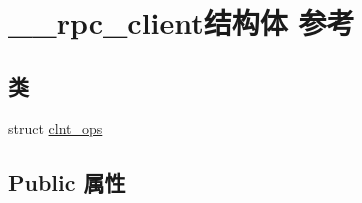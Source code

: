 \hypertarget{struct____rpc__client}{}\section{\+\_\+\+\_\+rpc\+\_\+client结构体 参考}
\label{struct____rpc__client}
\subsection*{类}
\begin{DoxyCompactItemize}
\item 
struct \hyperlink{struct____rpc__client_1_1clnt__ops}{clnt\+\_\+ops}
\end{DoxyCompactItemize}
\subsection*{Public 属性}

